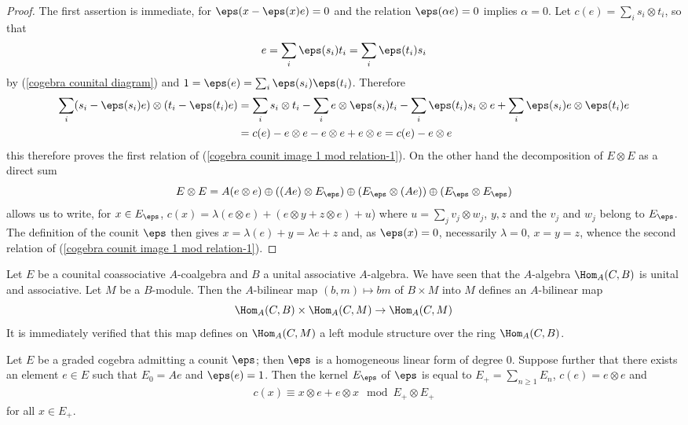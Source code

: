 \begin{proof}
The first assertion is immediate, for $\eps(x-\eps(x)e)=0$ and the relation $\eps(\alpha e)=0$ implies $\alpha=0$. Let $c(e)=\sum_is_i\otimes t_i$, so that
\[e=\sum_i\eps(s_i)t_i=\sum_i\eps(t_i)s_i\]
by (\ref{cogebra counital diagram}) and $1=\eps(e)=\sum_i\eps(s_i)\eps(t_i)$. Therefore
\begin{align*}
\sum_i(s_i-\eps(s_i)e)\otimes(t_i-\eps(t_i)e)&=\sum_is_i\otimes t_i-\sum_i e\otimes \eps(s_i)t_i-\sum_i\eps(t_i)s_i\otimes e+\sum_i\eps(s_i)e\otimes\eps(t_i)e\\
&=c(e)-e\otimes e-e\otimes e+e\otimes e=c(e)-e\otimes e
\end{align*}
this therefore proves the first relation of (\ref{cogebra counit image 1 mod relation-1}). On the other hand the decomposition of $E\otimes E$ as a direct sum
\[E\otimes E=A(e\otimes e)\oplus((Ae)\otimes E_\eps)\oplus(E_\eps\otimes(Ae))\oplus(E_\eps\otimes E_\eps)\]
allows us to write, for $x\in E_\eps$, $c(x)=\lambda(e\otimes e)+(e\otimes y+z\otimes e)+u$) where $u=\sum_jv_j\otimes w_j$, $y,z$ and the $v_j$ and $w_j$ belong to $E_\eps$. The definition of the counit $\eps$ then gives $x=\lambda(e)+y=\lambda e+z$ and, as $\eps(x)=0$, necessarily $\lambda=0$, $x=y=z$, whence the second relation of (\ref{cogebra counit image 1 mod relation-1}).
\end{proof}
\begin{remark}
Let $E$ be a counital coassociative $A$-coalgebra and $B$ a unital associative $A$-algebra. We have seen that the $A$-algebra $\Hom_A(C,B)$ is unital and associative. Let $M$ be a $B$-module. Then the $A$-bilinear map $(b,m)\mapsto bm$ of $B\times M$ into $M$ defines an $A$-bilinear map
\[\Hom_A(C,B)\times\Hom_A(C,M)\to \Hom_A(C,M)\]
It is immediately verified that this map defines on $\Hom_A(C,M)$ a left module structure over the ring $\Hom_A(C,B)$.
\end{remark}
\begin{proposition}\label{cogebra graded counit prop}
Let $E$ be a graded cogebra admitting a counit $\eps$; then $\eps$ is a homogeneous linear form of degree $0$. Suppose further that there exists an element $e\in E$ such that $E_0=Ae$ and $\eps(e)=1$. Then the kernel $E_\eps$ of $\eps$ is equal to $E_+=\sum_{n\geq 1}E_n$, $c(e)=e\otimes e$ and
\begin{align}
c(x)\equiv x\otimes e+e\otimes x\mod E_+\otimes E_+
\end{align}
for all $x\in E_+$.
\end{proposition}

